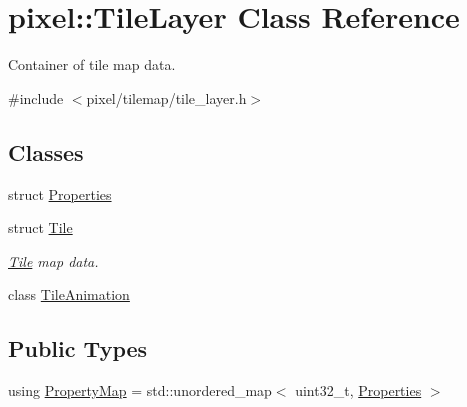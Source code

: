 \hypertarget{classpixel_1_1_tile_layer}{}\section{pixel\+:\+:Tile\+Layer Class Reference}
\label{classpixel_1_1_tile_layer}


Container of tile map data.  




{\ttfamily \#include $<$pixel/tilemap/tile\+\_\+layer.\+h$>$}

\subsection*{Classes}
\begin{DoxyCompactItemize}
\item 
struct \hyperlink{structpixel_1_1_tile_layer_1_1_properties}{Properties}
\item 
struct \hyperlink{structpixel_1_1_tile_layer_1_1_tile}{Tile}
\begin{DoxyCompactList}\small\item\em \hyperlink{structpixel_1_1_tile_layer_1_1_tile}{Tile} map data. \end{DoxyCompactList}\item 
class \hyperlink{classpixel_1_1_tile_layer_1_1_tile_animation}{Tile\+Animation}
\end{DoxyCompactItemize}
\subsection*{Public Types}
\begin{DoxyCompactItemize}
\item 
using \hyperlink{classpixel_1_1_tile_layer_a574b12c49854419c8ffb25e3a0929b57}{Property\+Map} = std\+::unordered\+\_\+map$<$ uint32\+\_\+t, \hyperlink{structpixel_1_1_tile_layer_1_1_properties}{Properties} $>$
\end{DoxyCompactItemize}
